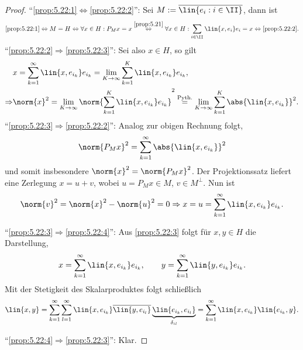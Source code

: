 \begin{proof}
``\ref{prop:5.22:1}$\Leftrightarrow$\ref{prop:5.22:2}'': Sei $M:=
\overline{\lin{e_i:i\in\II}}$, dann ist
\begin{align*}
\text{\ref{prop:5.22:1}} \Leftrightarrow M = H \Leftrightarrow
\forall x\in H : P_Mx = x
\overset{\ref{prop:5.21}}{\Leftrightarrow}
\forall x\in H : \sum\limits_{i\in\II} \lin{x,e_i}e_i = x \Leftrightarrow
\text{\ref{prop:5.22:2}}.
\end{align*}
``\ref{prop:5.22:2}$\Rightarrow$\ref{prop:5.22:3}'': Sei also $x\in H$, so
gilt
\begin{align*}
&x = \sum\limits_{k=1}^\infty \lin{x,e_{i_k}}e_{i_k}
=
\lim\limits_{K\to\infty} \sum\limits_{k=1}^K \lin{x,e_{i_k}}e_{i_k},\\
\Rightarrow & 
\norm{x}^2 =  \lim\limits_{K\to\infty} \norm{\sum\limits_{k=1}^K
\lin{x,e_{i_k}}e_{i_k}}^2 \overset{\text{Pyth.}}{=}
\lim\limits_{K\to\infty} 
\sum\limits_{k=1}^K \abs{\lin{x,e_{i_k}}}^2.
\end{align*}
``\ref{prop:5.22:3}$\Rightarrow$\ref{prop:5.22:2}'':
Analog zur obigen Rechnung folgt,
\begin{align*}
\norm{P_Mx}^2 = \sum\limits_{k=1}^\infty \abs{\lin{x,e_{i_k}}}^2
\end{align*}
und somit insbesondere $\norm{x}^2 =
\norm{P_Mx}^2$. Der Projektionssatz liefert eine Zerlegung $x=u+v$, wobei
$u=P_Mx\in M$, $v\in M^\bot$. Nun ist 
\begin{align*}
\norm{v}^2 =
\norm{x}^2-\norm{u}^2=0\Rightarrow x = u = \sum\limits_{k=1}^\infty
\lin{x,e_{i_k}}e_{i_k}.
\end{align*}

``\ref{prop:5.22:3}$\Rightarrow$\ref{prop:5.22:4}'': Aus \ref{prop:5.22:3}
folgt für $x,y\in H$ die Darstellung,
\begin{align*}
x = \sum\limits_{k=1}^\infty \lin{x,e_{i_k}}e_{i_k},\qquad
y=\sum\limits_{k=1}^\infty \lin{y,e_{i_k}}e_{i_k}.
\end{align*}
Mit der Stetigkeit des Skalarproduktes folgt schließlich
\begin{align*}
\lin{x,y} = \sum\limits_{k=1}^\infty\sum\limits_{l=1}^\infty
\lin{x,e_{i_k}}\overline{\lin{y,e_{i_l}}}\underbrace{\lin{e_{i_k},e_{i_l}}}_{\delta_{il}}
= \sum\limits_{k=1}^\infty \lin{x,e_{i_k}}\lin{e_{i_k},y}.
\end{align*}

``\ref{prop:5.22:4}$\Rightarrow$\ref{prop:5.22:3}'': Klar.\qedhere
\end{proof}

